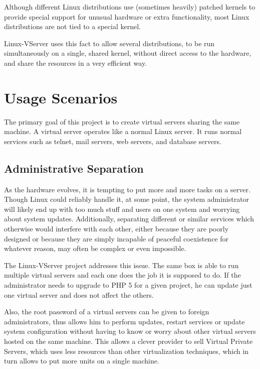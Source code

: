 Although different Linux distributions use (sometimes heavily) patched kernels
to provide special support for unusual hardware or extra functionality, most
Linux distributions are not tied to a special kernel.

Linux-VServer uses this fact to allow several distributions, to be run
simultaneously on a single, shared kernel, without direct access to the
hardware, and share the resources in a very efficient way.


\section{Usage Scenarios}

The primary goal of this project is to create virtual servers sharing the same
machine. A virtual server operates like a normal Linux server. It runs normal
services such as telnet, mail servers, web servers, and database servers.


\subsection{Administrative Separation}

As the hardware evolves, it is tempting to put more and more tasks on a server.
Though Linux could reliably handle it, at some point, the system administrator
will likely end up with too much stuff and users on one system and worrying
about system updates. Additionally, separating different or similar services
which otherwise would interfere with each other, either because they are poorly
designed or because they are simply incapable of peaceful coexistence for
whatever reason, may often be complex or even impossible.

The Linux-VServer project addresses this issue. The same box is able to run
multiple virtual servers and each one does the job it is supposed to do. If the
administrator needs to upgrade to PHP 5 for a given project, he can update just
one virtual server and does not affect the others.

Also, the root password of a virtual servers can be given to foreign
administrators, thus allows him to perform updates, restart services or update
system configuration without having to know or worry about other virtual
servers hosted on the same machine. This allows a clever provider to sell
Virtual Private Servers, which uses less resources than other virtualization
techniques, which in turn allows to put more units on a single machine.

